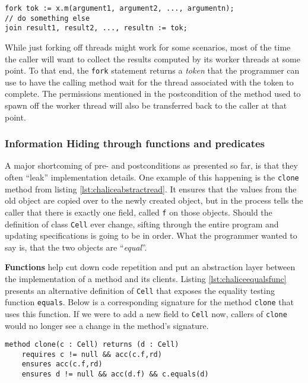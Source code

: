 \clearpage

\begin{lstlisting}[language=Chalice]
fork tok := x.m(argument1, argument2, ..., argumentn);
// do something else
join result1, result2, ..., resultn := tok;
\end{lstlisting}

While just forking off threads might work for some scenarios, most of the time the caller will want to collect the results computed by its worker threads at some point.
To that end, the \lstinline[language=Chalice]!fork! statement returns a \emph{token} that the programmer can use to have the calling method wait for the thread associated with the token to complete.
The permissions mentioned in the postcondition of the method used to spawn off the worker thread will also be transferred back to the caller at that point.

\subsubsection{Information Hiding through functions and predicates}
A major shortcoming of pre- and postconditions as presented so far, is that they often ``leak'' implementation details. 
One example of this happening is the \lstinline!clone! method from listing \ref{lst:chaliceabstractread}. 
It ensures that the values from the old object are copied over to the newly created object, but in the process tells the caller that there is exactly one field, called \lstinline!f! on those objects. 
Should the definition of class \lstinline!Cell! ever change, sifting through the entire program and updating specifications is going to be in order.
What the programmer wanted to say is, that the two objects are ``\emph{equal}''. 

\textbf{Functions} help cut down code repetition and put an abstraction layer between the implementation of a method and its clients. 
Listing \ref{lst:chaliceequalsfunc} presents an alternative definition of \lstinline!Cell! that exposes the equality testing function \lstinline!equals!. 
Below is a corresponding signature for the method \lstinline!clone! that uses this function. 
If we were to add a new field to \lstinline!Cell! now, callers of \lstinline!clone! would no longer see a change in the method's signature.

\begin{lstlisting}[language=Chalice]
method clone(c : Cell) returns (d : Cell)
    requires c != null && acc(c.f,rd)
    ensures acc(c.f,rd)
    ensures d != null && acc(d.f) && c.equals(d)
\end{lstlisting}

